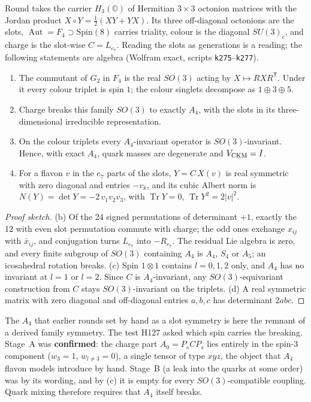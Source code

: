 Round  takes the carrier $H_3(\mathbb O)$ of Hermitian $3\times3$ octonion matrices with the Jordan product
$X\circ Y=\tfrac12(XY+YX)$. Its three off-diagonal octonions are the slots, $\operatorname{Aut}=F_4\supset\mathrm{Spin}(8)$
carries triality, colour is the diagonal $SU(3)_c$, and charge is the slot-wise $C=L_{e_7}$. Reading the slots as
generations is a reading; the following statements are algebra (Wolfram exact, scripts \texttt{k275}--\texttt{k277}).

\begin{proposition}[\rnd{r60}.1, .3, .4]\label{prop:B-albert}
\begin{enumerate}
\item[(a)] The commutant of $G_2$ in $F_4$ is the real $SO(3)$ acting by $X\mapsto RXR^{\mathsf T}$. Under it every colour
triplet is spin $1$; the colour singlets decompose as $1\oplus3\oplus5$.
\item[(b)] Charge breaks this family $SO(3)$ to exactly $A_4$, with the slots in its three-dimensional irreducible
representation.
\item[(c)] On the colour triplets every $A_4$-invariant operator is $SO(3)$-invariant. Hence, with exact $A_4$, quark masses
are degenerate and $V_{\rm CKM}=I$.
\item[(d)] For a flavon $v$ in the $e_7$ parts of the slots, $Y=C\,X(v)$ is real symmetric with zero diagonal and entries
$-v_k$, and its cubic Albert norm is $N(Y)=\det Y=-2\,v_1v_2v_3$, with $\operatorname{Tr}Y=0$, $\operatorname{Tr}Y^2=2|v|^2$.
\end{enumerate}
\end{proposition}

\begin{proof}[Proof sketch]
(b) Of the 24 signed permutations of determinant $+1$, exactly the 12 with even slot permutation commute with charge; the
odd ones exchange $x_{ij}$ with $\bar x_{ij}$, and conjugation turns $L_{e_7}$ into $-R_{e_7}$. The residual Lie algebra is
zero, and every finite subgroup of $SO(3)$ containing $A_4$ is $A_4$, $S_4$ or $A_5$; an icosahedral rotation breaks.
(c) Spin $1\otimes1$ contains $l=0,1,2$ only, and $A_4$ has no invariant at $l=1$ or $l=2$. Since $C$ is $A_4$-invariant, any
$SO(3)$-equivariant construction from $C$ stays $SO(3)$-invariant on the triplets. (d) A real symmetric matrix with zero
diagonal and off-diagonal entries $a,b,c$ has determinant $2abc$.
\end{proof}

The $A_4$ that earlier rounds set by hand as a slot symmetry is here the remnant of a derived family symmetry. The test
H127 asked which spin carries the breaking. Stage~A was \textbf{confirmed}: the charge part
$A_0=P_sCP_s$ lies entirely in the spin-3 component ($w_3=1$, $w_{l\neq3}=0$), a single tensor of type $xyz$, the object that
$A_4$ flavon models introduce by hand. Stage~B (a leak into the quarks at some order) was \Refuted{} by its wording, and by
(c) it is empty for every $SO(3)$-compatible coupling. Quark mixing therefore requires that $A_4$ itself breaks.


